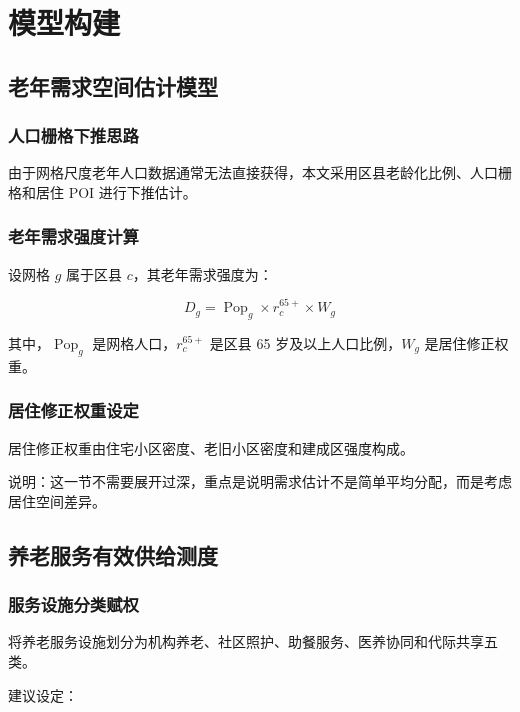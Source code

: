 \section{模型构建}

\subsection{老年需求空间估计模型}

\subsubsection{人口栅格下推思路}

由于网格尺度老年人口数据通常无法直接获得，本文采用区县老龄化比例、人口栅格和居住 POI 进行下推估计。

\subsubsection{老年需求强度计算}

设网格 $g$ 属于区县 $c$，其老年需求强度为：

\begin{equation}
D_g = \operatorname{Pop}_g \times r_c^{65+} \times W_g
\end{equation}

其中，$\operatorname{Pop}_g$ 是网格人口，$r_c^{65+}$ 是区县 65 岁及以上人口比例，$W_g$ 是居住修正权重。

\subsubsection{居住修正权重设定}

居住修正权重由住宅小区密度、老旧小区密度和建成区强度构成。

说明：这一节不需要展开过深，重点是说明需求估计不是简单平均分配，而是考虑居住空间差异。

\subsection{养老服务有效供给测度}

\subsubsection{服务设施分类赋权}

将养老服务设施划分为机构养老、社区照护、助餐服务、医养协同和代际共享五类。

建议设定：

